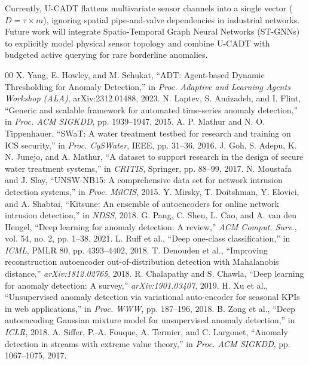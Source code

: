 \documentclass[conference]{IEEEtran}
\begin{document}
Currently, U-CADT flattens multivariate sensor channels into a single vector ($D = \tau \times m$), ignoring spatial pipe-and-valve dependencies in industrial networks. Future work will integrate Spatio-Temporal Graph Neural Networks (ST-GNNs) to explicitly model physical sensor topology and combine U-CADT with budgeted active querying for rare borderline anomalies.

\begin{thebibliography}{00}
 X. Yang, E. Howley, and M. Schukat, ``ADT: Agent-based Dynamic Thresholding for Anomaly Detection,'' in \textit{Proc. Adaptive and Learning Agents Workshop (ALA)}, arXiv:2312.01488, 2023.
 N. Laptev, S. Amizadeh, and I. Flint, ``Generic and scalable framework for automated time-series anomaly detection,'' in \textit{Proc. ACM SIGKDD}, pp. 1939--1947, 2015.
 A. P. Mathur and N. O. Tippenhauer, ``SWaT: A water treatment testbed for research and training on ICS security,'' in \textit{Proc. CySWater}, IEEE, pp. 31--36, 2016.
 J. Goh, S. Adepu, K. N. Junejo, and A. Mathur, ``A dataset to support research in the design of secure water treatment systems,'' in \textit{CRITIS}, Springer, pp. 88--99, 2017.
 N. Moustafa and J. Slay, ``UNSW-NB15: A comprehensive data set for network intrusion detection systems,'' in \textit{Proc. MilCIS}, 2015.
 Y. Mirsky, T. Doitshman, Y. Elovici, and A. Shabtai, ``Kitsune: An ensemble of autoencoders for online network intrusion detection,'' in \textit{NDSS}, 2018.
 G. Pang, C. Shen, L. Cao, and A. van den Hengel, ``Deep learning for anomaly detection: A review,'' \textit{ACM Comput. Surv.}, vol. 54, no. 2, pp. 1--38, 2021.
 L. Ruff et al., ``Deep one-class classification,'' in \textit{ICML}, PMLR 80, pp. 4393--4402, 2018.
 T. Denouden et al., ``Improving reconstruction autoencoder out-of-distribution detection with Mahalanobis distance,'' \textit{arXiv:1812.02765}, 2018.
 R. Chalapathy and S. Chawla, ``Deep learning for anomaly detection: A survey,'' \textit{arXiv:1901.03407}, 2019.
 H. Xu et al., ``Unsupervised anomaly detection via variational auto-encoder for seasonal KPIs in web applications,'' in \textit{Proc. WWW}, pp. 187--196, 2018.
 B. Zong et al., ``Deep autoencoding Gaussian mixture model for unsupervised anomaly detection,'' in \textit{ICLR}, 2018.
 A. Siffer, P.-A. Fouque, A. Termier, and C. Largouet, ``Anomaly detection in streams with extreme value theory,'' in \textit{Proc. ACM SIGKDD}, pp. 1067--1075, 2017.

\end{thebibliography}
\end{document}
